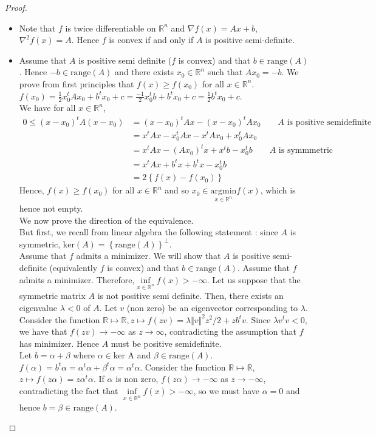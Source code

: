 \documentclass{article}
\begin{document}
\begin{proof}
\begin{itemize}
\item[a)]
Note that $f$ is twice differentiable on $\mathbb{R}^n$ and $\nabla f(x)=Ax+b$, $\nabla^2f(x)=A$. Hence $f$ is convex if and only if $A$ is positive semi-definite.
\item[b)]
Assume that $A$ is positive semi definite ($f$ is convex) and that $b \in \text{range}(A)$. Hence $-b \in \text{range}(A)$ and there exists $x_0 \in \mathbb{R}^n$ such that $Ax_0=-b$. We prove from first principles that $f(x) \geq f(x_0)$ for all $x \in \mathbb{R}^n$. \\
$f(x_0)=\frac{1}{2}x_0^t Ax_0+b^tx_0+c=\frac{-1}{2}x_0^tb+b^tx_0+c=\frac{1}{2}b^tx_0+c$. \\
 We have for all $x \in \mathbb{R}^n$,
\begin{align*}
0 \leq (x-x_0)^tA(x-x_0)&=(x-x_0)^tAx-(x-x_0)^tAx_0  \quad \quad  \text{$A$ is positive semidefinite}\\  
&=x^tAx-x_0^tAx-x^tAx_0+x_0^tAx_0 \\
&=x^tAx-(Ax_0)^tx+x^tb-x_0^tb \quad \quad \text{$A$ is symmmetric}\\
&=x^tAx+b^tx+b^tx-x_0^tb\\
&=2\left\{f(x)-f(x_0)\right\}
\end{align*}
Hence, $f(x) \ge f(x_0)$ for all $x \in \mathbb{R}^{n}$ and so $x_0 \in \text{argmin}\limits_{x \in \mathbb{R}^n} f(x)$, which is hence not empty.\\

We now prove the direction  of the equivalence.\\ But first, we recall from linear algebra the following statement : since $A$ is symmetric, $\text{ker}(A)=\left\{\text{range}(A)\right\}^\perp$.\\

Assume that $f$ admits a minimizer. We will show that $A$ is positive semi-definite  (equivalently $f$ is convex) and that $b \in \text{range}(A)$.
Assume that $f$ admits a minimizer. Therefore,$\inf\limits_{x \in \mathbb{R}^n} f(x) > - \infty$. Let us suppose that the symmetric matrix $A$ is not positive semi definite. Then, there exists an eigenvalue $ \lambda < 0$ of $A$. Let $v$ (non zero) be an eigenvector corresponding to $\lambda$. Consider the function $\mathbb{R} \mapsto \mathbb{R}, z \mapsto f(zv)={\lambda \Vert v \Vert ^2 z^2}/{2} +zb^tv$. Since $ \lambda v^tv <0$, we have that $f(zv) \to -\infty$ as $z \to \infty$, contradicting the assumption that $f$ has minimizer. Hence $A$ must be positive semidefinite.\\
Let $b=\alpha+ \beta$ where $\alpha \in \text{ker A}$ and $\beta \in \text{range}(A)$.\\
$f(\alpha)=b^t \alpha=\alpha^t \alpha+ \beta^t \alpha=\alpha^t \alpha$. Consider the function $\mathbb{R} \mapsto \mathbb{R}$, $z \mapsto f(z \alpha)=z \alpha^t \alpha$. If $\alpha$ is non zero, $f(z \alpha) \to -\infty$ as $z \to -\infty$, contradicting the fact that  $\inf\limits_{x \in \mathbb{R}^n} f(x) > - \infty$, so we must have $\alpha=0$ and hence $b=\beta \in \text{range}(A)$.
\end{itemize}
\end{proof}
\end{document}
